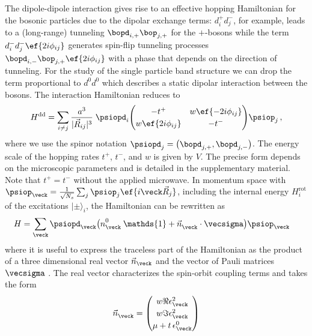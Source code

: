 The dipole-dipole interaction gives rise to an effective hopping Hamiltonian for the bosonic particles due to the dipolar exchange terms:
$d^+_id^-_j$, for example, leads to a (long-range) tunneling $\bopd_{i,+}\bop_{j,+}$ for the ${+}$-bosons while the term $d^-_i d^-_j \ef{2i\phi_{i j}}$ generates spin-flip tunneling processes $\bopd_{i,-}\bop_{j,+} \ef{2i\phi_{ij}}$ with a phase that depends on the direction of tunneling.
For the study of the single particle band structure we can drop the term proportional to $d^0 d^0$ which describes a static dipolar interaction between the bosons.
The interaction Hamiltonian reduces to
\begin{align}
    H^{\text{dd}} = \sum_{i\ne j}
    \frac{a^3}{|\vec{R}_{ij}|^3}\;
    \psiopd_i\!
    \begingroup
        \renewcommand*{\arraystretch}{1.2}
        \begin{pmatrix}
            -t^+ & w \ef{-2i\phi_{ij}} \\
            w \ef{2i\phi_{ij}} & -t^-
        \end{pmatrix}
    \endgroup\!
    \psiop_j \,,
    \label{eq:hrealspace}
\end{align}
where we use the spinor notation $\psiopd_j = \big( \bopd_{j,+} , \bopd_{j,-} \big)$.
The energy scale of the hopping rates $t^+$, $t^-$, and $w$ is given by $V$. The precise form depends on the microscopic parameters and is detailed in the supplementary material.
Note that $t^{+} = t^{-}$ without the applied microwave.
In momentum space with $\psiop_{\veck}=\frac{1}{\sqrt{N_s}}\sum_{j} \psiop_{j}\ef{i\veck\vec{R}_j}$, including the internal energy $H_{i}^{\text{rot}}$ of the excitations $|\pm\rangle_{i}$, the Hamiltonian can be rewritten as
\begin{align}
    H &= \sum_{\veck} \psiopd_{\veck} \big({n^{0\vphantom\dagger}_{\veck} \: \mathds{1} + \vec{n}^{\vphantom \dagger}_{\veck}\cdot\vecsigma}\big) \psiop_{\veck}
    \label{eq:hkspace}
\end{align}
where it is useful to express the traceless part of the Hamiltonian
as the product of a three dimensional real vector $\vec{n}_{\veck}$ and the vector of Pauli matrices $\vecsigma$ \cite{Hasan2010,Bernevig2013}.
The real vector characterizes the spin-orbit coupling terms and takes the form
\begin{align}
    \vec{n}^{\vphantom 0}_{\veck} = \begin{pmatrix}
        w \Re \epsilon^2_{\veck} \\
        w \Im \epsilon^2_{\veck} \\
        \mu + t\, \epsilon^0_{\veck}
    \end{pmatrix}
\end{align}
